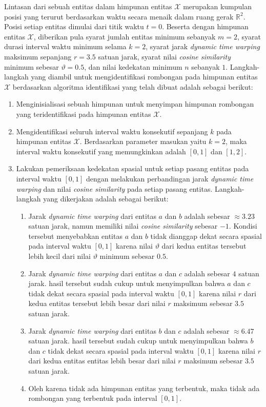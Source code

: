 Lintasan dari sebuah entitas dalam himpunan entitas $\mathcal{X}$ merupakan kumpulan posisi yang terurut berdasarkan waktu secara menaik dalam ruang gerak $\mathbb{R}^2$. Posisi setiap entitas dimulai dari titik waktu $t = 0$. Beserta dengan himpunan entitas $\mathcal{X}$, diberikan pula syarat jumlah entitas minimum sebanyak $m = 2$, syarat durasi interval waktu minimum selama $k = 2$, syarat jarak \textit{dynamic time warping} maksimum sepanjang $r = 3.5$ satuan jarak, syarat nilai \textit{cosine similarity} minimum sebesar $\vartheta = 0.5$, dan nilai kedekatan minimum $n$ sebanyak $1$. Langkah-langkah yang diambil untuk mengidentifikasi rombongan pada himpunan entitas $\mathcal{X}$ berdasarkan algoritma identifikasi yang telah dibuat adalah sebagai berikut:

\begin{enumerate}
    \item Menginisialisasi sebuah himpunan untuk menyimpan himpunan rombongan yang teridentifikasi pada himpunan entitas $\mathcal{X}$.
    \item Mengidentifikasi seluruh interval waktu konsekutif sepanjang $k$ pada himpunan entitas $\mathcal{X}$. Berdasarkan parameter masukan yaitu $k = 2$, maka interval waktu konsekutif yang memungkinkan adalah $[0, 1]$ dan $[1, 2]$.
    \item Lakukan pemeriksaan kedekatan spasial untuk setiap pasang entitas pada interval waktu $[0, 1]$ dengan melakukan perbandingan jarak \textit{dynamic time warping} dan nilai \textit{cosine similarity} pada setiap pasang entitas. Langkah-langkah yang dikerjakan adalah sebagai berikut: 
    
    \begin{enumerate}
        \item Jarak \textit{dynamic time warping} dari entitas $a$ dan $b$ adalah sebesar $\approx 3.23$ satuan jarak, namun memiliki nilai \textit{cosine similarity} sebesar $-1$. Kondisi tersebut menyebabkan entitas $a$ dan $b$ tidak dianggap dekat secara spasial pada interval waktu $[0, 1]$ karena nilai $\vartheta$ dari kedua entitas tersebut lebih kecil dari nilai $\vartheta$ minimum sebesar $0.5$.
        \item Jarak \textit{dynamic time warping} dari entitas $a$ dan $c$ adalah sebesar $4$ satuan jarak. hasil tersebut sudah cukup untuk menyimpulkan bahwa $a$ dan $c$ tidak dekat secara spasial pada interval waktu $[0, 1]$ karena nilai $r$ dari kedua entitas tersebut lebih besar dari nilai $r$ maksimum sebesar $3.5$ satuan jarak.
        \item Jarak \textit{dynamic time warping} dari entitas $b$ dan $c$ adalah sebesar $\approx 6.47$ satuan jarak. hasil tersebut sudah cukup untuk menyimpulkan bahwa $b$ dan $c$ tidak dekat secara spasial pada interval waktu $[0, 1]$ karena nilai $r$ dari kedua entitas entitas lebih besar dari nilai $r$ maksimum sebesar $3.5$ satuan jarak.
        \item Oleh karena tidak ada himpunan entitas yang terbentuk, maka tidak ada rombongan yang terbentuk pada interval $[0, 1]$.
    \end{enumerate}
    

\end{enumerate}
